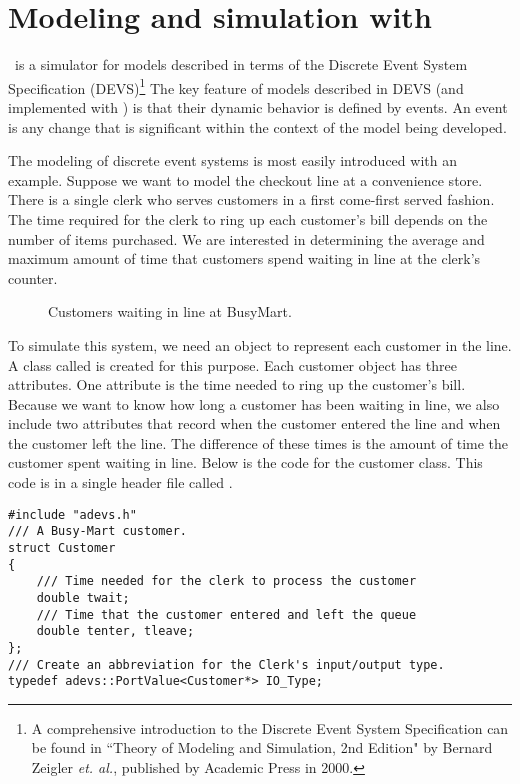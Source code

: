 \chapter{Modeling and simulation with \adevs}
\label{chapter:intro}
\adevs\ is a simulator for models described in terms of the Discrete Event System Specification (DEVS)\footnote{A comprehensive introduction to the Discrete Event System Specification can be found in ``Theory of Modeling and Simulation, 2nd Edition" by Bernard Zeigler \textit{et. al.}, published by Academic Press in 2000.} The key feature of models described in DEVS (and implemented with \adevs) is that their dynamic behavior is defined by events. An event is any change that is significant within the context of the model being developed.

The modeling of discrete event systems is most easily introduced with an example. Suppose we want to model the checkout line at a convenience store. There is a single clerk who serves customers in a first come-first served fashion. The time required for the clerk to ring up each customer's bill depends on the number of items purchased. We are interested in determining the average and maximum amount of time that customers spend waiting in line at the clerk's counter.
\begin{figure}[ht]
\centering
{}
\caption{Customers waiting in line at BusyMart.}
\label{fig:busy_mart}
\end{figure}

To simulate this system, we need an object to represent each customer in the line. A class called  is created for this purpose. Each customer object has three attributes. One attribute is the time needed to ring up the customer's bill. Because we want to know how long a customer has been waiting in line, we also include two attributes that record when the customer entered the line and when the customer left the line. The difference of these times is the amount of time the customer spent waiting in line. Below is the code for the customer class. This code is in a single header file called .
\begin{verbatim}
#include "adevs.h"
/// A Busy-Mart customer.
struct Customer
{
    /// Time needed for the clerk to process the customer
    double twait;
    /// Time that the customer entered and left the queue
    double tenter, tleave;
};
/// Create an abbreviation for the Clerk's input/output type.
typedef adevs::PortValue<Customer*> IO_Type;
\end{verbatim}

